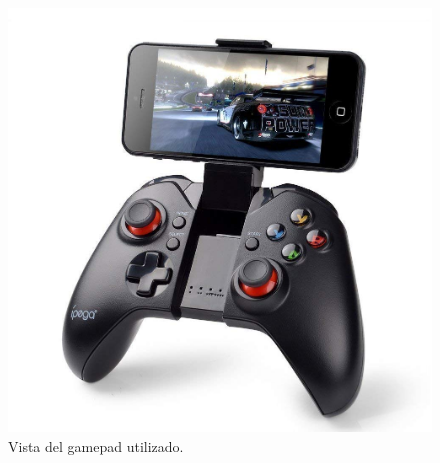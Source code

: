 \begin{figure}[H]
  \begin{center}
    \includegraphics[scale=0.2]{imagenes/robot/control_pad.jpg}
  \end{center}
  \caption{Vista del gamepad utilizado.}
  \label{figura:rpi-modulo-bateria}
\end{figure}
